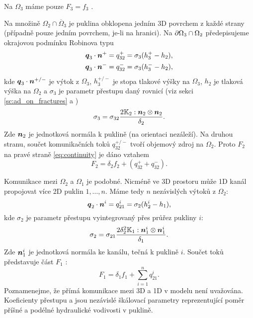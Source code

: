Na $\Omega_3$ máme pouze $F_3  = f_3$ .

Na množině $\Omega_2 \cap \overline\Omega_3$ je puklina obklopena jedním 3D povrchem z každé strany (případně pouze jedním povrchem, je-li  na hranici).
Na $\partial\Omega_3 \cap \Omega_2$ předepisujeme okrajovou podmínku Robinova typu
\begin{align*}
        \mathbf{\boldsymbol{q}}_3\cdot \mathbf{\boldsymbol{n}}^{+} &= q_{32}^{+} =\sigma_{3} (h_3^{+}-h_2),\\
        \mathbf{\boldsymbol{q}}_3\cdot \mathbf{\boldsymbol{n}}^{-} &= q_{32}^{-} =\sigma_{3} (h_3^{-}-h_2),
\end{align*}
kde $\mathbf{\boldsymbol{q}}_3\cdot\mathbf{\boldsymbol{n}}^{+/-}$  je výtok z $\Omega_3$, $h_3^{+/-}$ je
stopa tlakové výšky na $\Omega_3$, $h_2$ je tlaková výška na $\Omega_2$ a
$\sigma_{3}$  je parametr přestupu daný rovnicí (viz sekci \ref{sc:ad_on_fractures} a \cite{martin_modeling_2005})
\[
\label{e:sigma3_law}
  \sigma_3 = \sigma_{32} \frac{2{\mathbb{K}}_2 :\mathbf{\boldsymbol{n}}_2\otimes\mathbf{\boldsymbol{n}}_2 }{\delta_2}.
\]
Zde $\mathbf{\boldsymbol{n}}_2$ je jednotková normála k puklině (na orientaci nezáleží).
Na druhou stranu, součet komunikačních toků $q_{32}^{+/-}$ tvoří
objemový zdroj na $\Omega_2$.  Proto $F_2$  na pravé straně \eqref{eq:continuity} je dáno vztahem
\begin{equation}
   \label{source_2D}
   F_2 = \delta_2 f_2 + (q_{32}^{+} + q_{32}^{-}).
\end{equation}

Komunikace mezi $\Omega_2$  a  $\Omega_1$ je podobné.  Nicméně ve 3D prostoru
může 1D kanál propojovat více 2D puklin $1,\dots, n$. Máme tedy $n$
nezávislých výtoků z $\Omega_2$:
\begin{equation*}
        \mathbf{\boldsymbol{q}}_2\cdot \mathbf{\boldsymbol{n}}^{i} = q_{21}^{i} =\sigma_{2} (h_2^{i}-h_1),
\end{equation*}
kde $\sigma_2$  je parametr přestupu vyintegrovaný přes průřez pukliny $i$:
\[
\label{e:sigma2_law}
  \sigma_2 = \sigma_{21} \frac{2\delta_2^2{\mathbb{K}}_1:{\mathbf{\boldsymbol{n}}_1^i}\otimes{\mathbf{\boldsymbol{n}}_1^i}}{\delta_1}.
\]
Zde $\mathbf{\boldsymbol{n}}_1^i$ je jednotková normála ke kanálu, tečná k puklině $i$.
Součet toků představuje část $F_1$ :
\begin{equation}
   \label{source_1D}
   F_1 = \delta_1 f_1 + \sum_{i=1}^n q_{21}^{i}. 
\end{equation}
Poznamenejme, že přímá komunikace mezi 3D a 1D v modelu není uvažována.
Koeficienty přestupu
 \units{}{}{} a
 \units{}{}{} jsou nezávislé škálovací parametry reprezentující poměr příšné a podélné hydraulické vodivosti v puklině.

